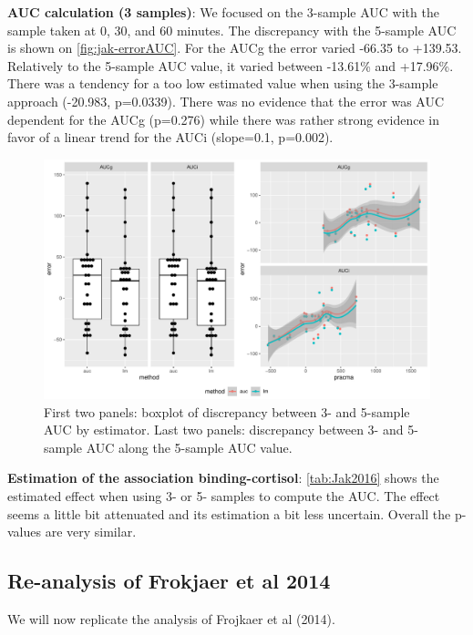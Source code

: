 \documentclass[12pt]{article}
\begin{document}
\textbf{AUC calculation (3 samples)}: We focused on the 3-sample AUC with the
sample taken at 0, 30, and 60 minutes. The discrepancy with the
5-sample AUC is shown on \autoref{fig:jak-errorAUC}. For the AUCg the
error varied -66.35 to +139.53. Relatively to the 5-sample AUC value,
it varied between -13.61\% and +17.96\%. There was a tendency for a too
low estimated value when using the 3-sample approach (-20.983,
p=0.0339). There was no evidence that the error was AUC dependent for
the AUCg (p=0.276) while there was rather strong evidence in favor of
a linear trend for the AUCi (slope=0.1, p=0.002). 

\begin{figure}[!h]
\centering
\includegraphics[width=1\textwidth]{./figures/gg-jak-errorAUC.pdf}
\caption{\label{fig:jak-errorAUC}First two panels: boxplot of discrepancy between 3- and 5-sample AUC by estimator. Last two panels: discrepancy between 3- and 5-sample AUC along the 5-sample AUC value.}
\end{figure}

\bigskip

\textbf{Estimation of the association binding-cortisol}: \autoref{tab:Jak2016} shows
the estimated effect when using 3- or 5- samples to compute the
AUC. The effect seems a little bit attenuated and its estimation a bit
less uncertain. Overall the p-values are very similar.

\subsection{Re-analysis of Frokjaer et al 2014}
\label{sec:orgfa089de}

We will now replicate the analysis of Frojkaer et al (2014).
\end{document}
